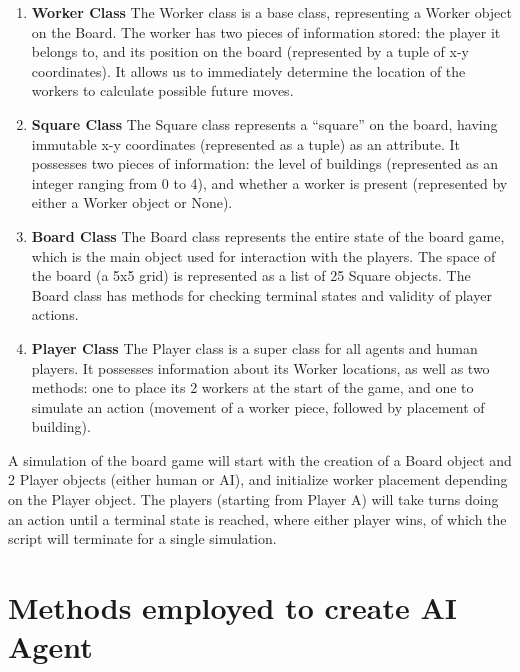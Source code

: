 \documentclass[a4paper,12pt,table]{article}
\begin{document}
\begin{enumerate}
    
    \item \textbf{Worker Class}
    \newline
    The Worker class is a base class, representing a Worker object on the Board. The worker has two pieces of information stored: the player it belongs to, and its position on the board (represented by a tuple of x-y coordinates). It allows us to immediately determine the location of the workers to calculate possible future moves.
    
    \item \textbf{Square Class}
    \newline
    The Square class represents a “square” on the board, having immutable x-y coordinates (represented as a tuple) as an attribute. It possesses two pieces of information: the level of buildings (represented as an integer ranging from 0 to 4), and whether a worker is present (represented by either a Worker object or None).
    
    \item \textbf{Board Class}
    \newline
    The Board class represents the entire state of the board game, which is the main object used for interaction with the players. The space of the board (a 5x5 grid) is represented as a list of 25 Square objects. The Board class has methods for checking terminal states and validity of player actions.
    
    \item \textbf{Player Class}
    \newline
    The Player class is a super class for all agents and human players. It possesses information about its Worker locations, as well as two methods: one to place its 2 workers at the start of the game, and one to simulate an action (movement of a worker piece, followed by placement of building). \par

\end{enumerate}
A simulation of the board game will start with the creation of a Board object and 2 Player objects (either human or AI), and initialize worker placement depending on the Player object. The players (starting from Player A) will take turns doing an action until a terminal state is reached, where either player wins, of which the script will terminate for a single simulation. \par

\section{Methods employed to create AI Agent}
\end{document}
